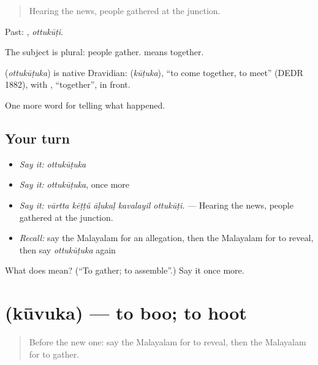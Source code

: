 \begin{quote}
Hearing the news, people gathered at the junction.
\end{quote}

Past: , \emph{ottukūṭi}.

The subject is plural: people gather.  means together.

\begin{cousinweb}
\textbf{} (\emph{ottukūṭuka}) is native Dravidian:  (\emph{kūṭuka}), \textquotedblleft{}to come together, to meet\textquotedblright{} (DEDR 1882), with , \textquotedblleft{}together\textquotedblright{}, in front.
\end{cousinweb}

\begin{grammarlens}[title={What you've built}]
One more word for telling what happened.
\end{grammarlens}

\subsection*{Your turn}
\begin{itemize}
\raggedright
  \item \emph{Say it:} \emph{ottukūṭuka}
  \item \emph{Say it:} \emph{ottukūṭuka}, once more
  \item \emph{Say it:} \emph{vārtta kēṭṭŭ āḷukaḷ kavalayil ottukūṭi.} — Hearing the news, people gathered at the junction.
  \item \emph{Recall:} say the Malayalam for an allegation, then the Malayalam for to reveal, then say \emph{ottukūṭuka} again
\end{itemize}

\begin{tcolorbox}[breakable,colback=teal!4,colframe=teal!35!black,title={Before you move on}]
What does  mean? (\textquotedblleft{}To gather; to assemble\textquotedblright{}.) Say it once more.
\end{tcolorbox}
\section[\texorpdfstring{\ml{കൂവുക} (kūvuka)}{കൂവുക (kūvuka)}]{ (kūvuka) — to boo; to hoot}

\label{lesson:ML-C355-kuvuka}



\begin{quote}
Before the new one: say the Malayalam for to reveal, then the Malayalam for to gather.
\end{quote}

